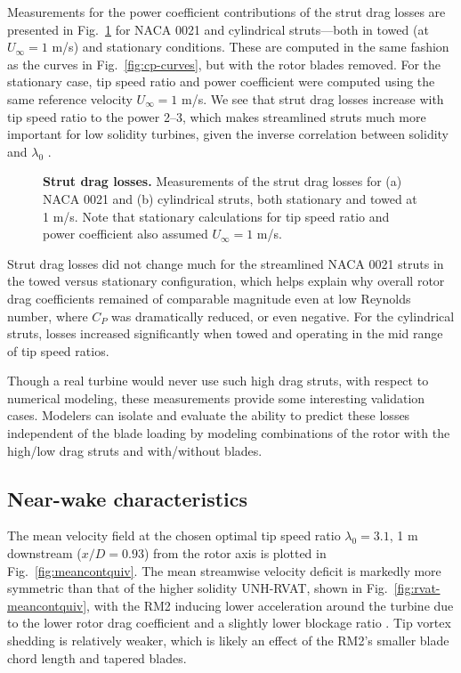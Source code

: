 \documentclass[10pt,letterpaper]{article}
\begin{document}
Measurements for the power coefficient contributions of the strut drag losses
are presented in Fig.~\ref{fig:no-blades} for NACA 0021 and cylindrical
struts---both in towed (at $U_\infty=1$ m/s) and stationary conditions. These
are computed in the same fashion as the curves in Fig.~\ref{fig:cp-curves}, but
with the rotor blades removed. For the stationary case, tip speed ratio and
power coefficient were computed using the same reference velocity $U_\infty=1$
m/s. We see that strut drag losses increase with tip speed ratio to the power
2--3, which makes streamlined struts much more important for low solidity
turbines, given the inverse correlation between solidity and $\lambda_0$
\cite{Templin1974}.

\begin{figure}

    \caption{{\bf Strut drag losses.} Measurements of the strut drag losses for
    (a) NACA 0021 and (b) cylindrical struts, both stationary and towed at 1
    m/s. Note that stationary calculations for tip speed ratio and power
    coefficient also assumed $U_\infty = 1$ m/s.}

    \label{fig:no-blades}
\end{figure}

Strut drag losses did not change much for the streamlined NACA 0021 struts in
the towed versus stationary configuration, which helps explain why overall rotor
drag coefficients remained of comparable magnitude even at low Reynolds number,
where $C_P$ was dramatically reduced, or even negative. For the cylindrical
struts, losses increased significantly when towed and operating in the mid range
of tip speed ratios.

Though a real turbine would never use such high drag struts, with respect to
numerical modeling, these measurements provide some interesting validation
cases. Modelers can isolate and evaluate the ability to predict these losses
independent of the blade loading by modeling combinations of the rotor with the
high/low drag struts and with/without blades.


\subsection*{Near-wake characteristics}

The mean velocity field at the chosen optimal tip speed ratio $\lambda_0=3.1$, 1
m downstream ($x/D=0.93$) from the rotor axis is plotted in
Fig.~\ref{fig:meancontquiv}. The mean streamwise velocity deficit is markedly
more symmetric than that of the higher solidity UNH-RVAT, shown in
Fig.~\ref{fig:rvat-meancontquiv}, with the RM2 inducing lower acceleration
around the turbine due to the lower rotor drag coefficient and a slightly lower
blockage ratio \cite{Bachant2015-JoT}. Tip vortex shedding is relatively weaker,
which is likely an effect of the RM2's smaller blade chord length and tapered
blades.
\end{document}
